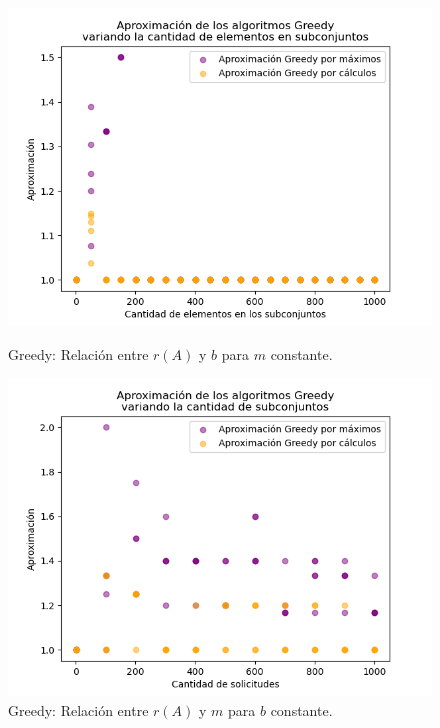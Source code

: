 \begin{figure}[h]
    \centering
    \begin{minipage}{0.45\textwidth}
        \centering
        \includegraphics[width=\textwidth]{img/medicion_r_greedy_var_b.png}
        \caption{Greedy: Relación entre $r(A)$ y $b$ para $m$ constante.}
        \label{fig:medicion_r_greedy_var_b}
    \end{minipage}\hfill
    \begin{minipage}{0.45\textwidth}
        \centering
        \includegraphics[width=\textwidth]{img/medicion_r_greedy_var_m.png}
        \caption{Greedy: Relación entre $r(A)$ y $m$ para $b$ constante.}
        \label{fig:medicion_r_greedy_var_m}
    \end{minipage}
\end{figure}

